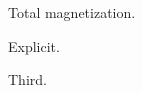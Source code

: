 \documentclass{article}
\makeatletter
\newcounter{figcaption}
\def\thefigcaption{\arabic{figcaption}}
\def\fnum@figcaption{{\bfseries Fig. \thefigcaption:}}
\makeatother
\begin{document}
\begin{figcaption}
\item Total magnetization.
\item[\fnum@figcaption] Explicit.
\item Third.
\end{figcaption}
\end{document}
